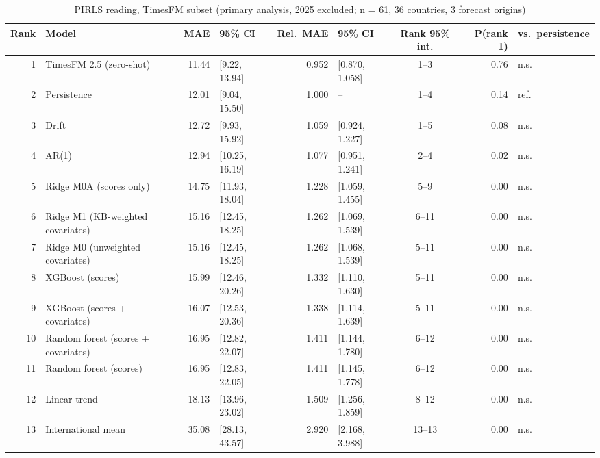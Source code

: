 \begin{table}[htbp]
\centering
\footnotesize
\caption{PIRLS reading, TimesFM subset (primary analysis, 2025 excluded; n = 61, 36 countries, 3 forecast origins)}
\label{tab:A17}
\begin{tabular}{rlrlrlcrl}
\toprule
Rank & Model & MAE & 95\% CI & Rel.\ MAE & 95\% CI & Rank 95\% int. & P(rank 1) & vs.\ persistence \\
\midrule
1 & TimesFM 2.5 (zero-shot) & 11.44 & [9.22, 13.94] & 0.952 & [0.870, 1.058] & 1--3 & 0.76 & n.s. \\
2 & Persistence & 12.01 & [9.04, 15.50] & 1.000 & -- & 1--4 & 0.14 & ref. \\
3 & Drift & 12.72 & [9.93, 15.92] & 1.059 & [0.924, 1.227] & 1--5 & 0.08 & n.s. \\
4 & AR(1) & 12.94 & [10.25, 16.19] & 1.077 & [0.951, 1.241] & 2--4 & 0.02 & n.s. \\
5 & Ridge M0A (scores only) & 14.75 & [11.93, 18.04] & 1.228 & [1.059, 1.455] & 5--9 & 0.00 & n.s. \\
6 & Ridge M1 (KB-weighted covariates) & 15.16 & [12.45, 18.25] & 1.262 & [1.069, 1.539] & 6--11 & 0.00 & n.s. \\
7 & Ridge M0 (unweighted covariates) & 15.16 & [12.45, 18.25] & 1.262 & [1.068, 1.539] & 5--11 & 0.00 & n.s. \\
8 & XGBoost (scores) & 15.99 & [12.46, 20.26] & 1.332 & [1.110, 1.630] & 5--11 & 0.00 & n.s. \\
9 & XGBoost (scores + covariates) & 16.07 & [12.53, 20.36] & 1.338 & [1.114, 1.639] & 5--11 & 0.00 & n.s. \\
10 & Random forest (scores + covariates) & 16.95 & [12.82, 22.07] & 1.411 & [1.144, 1.780] & 6--12 & 0.00 & n.s. \\
11 & Random forest (scores) & 16.95 & [12.83, 22.05] & 1.411 & [1.145, 1.778] & 6--12 & 0.00 & n.s. \\
12 & Linear trend & 18.13 & [13.96, 23.02] & 1.509 & [1.256, 1.859] & 8--12 & 0.00 & n.s. \\
13 & International mean & 35.08 & [28.13, 43.57] & 2.920 & [2.168, 3.988] & 13--13 & 0.00 & n.s. \\
\bottomrule
\end{tabular}
\par{}
\end{table}
